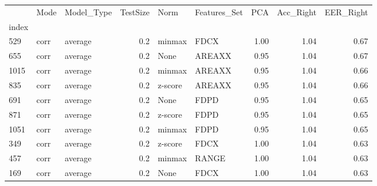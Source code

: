 \begin{tabular}{lllrllrrr}
\toprule
{} &  Mode & Model\_Type &  TestSize &     Norm & Features\_Set &   PCA &  Acc\_Right &  EER\_Right \\
index &       &            &           &          &              &       &            &            \\
\midrule
529   &  corr &    average &       0.2 &   minmax &         FDCX &  1.00 &       1.04 &       0.67 \\
655   &  corr &    average &       0.2 &     None &       AREAXX &  0.95 &       1.04 &       0.67 \\
1015  &  corr &    average &       0.2 &   minmax &       AREAXX &  0.95 &       1.04 &       0.66 \\
835   &  corr &    average &       0.2 &  z-score &       AREAXX &  0.95 &       1.04 &       0.66 \\
691   &  corr &    average &       0.2 &     None &         FDPD &  0.95 &       1.04 &       0.65 \\
871   &  corr &    average &       0.2 &  z-score &         FDPD &  0.95 &       1.04 &       0.65 \\
1051  &  corr &    average &       0.2 &   minmax &         FDPD &  0.95 &       1.04 &       0.65 \\
349   &  corr &    average &       0.2 &  z-score &         FDCX &  1.00 &       1.04 &       0.63 \\
457   &  corr &    average &       0.2 &   minmax &        RANGE &  1.00 &       1.04 &       0.63 \\
169   &  corr &    average &       0.2 &     None &         FDCX &  1.00 &       1.04 &       0.63 \\
\bottomrule
\end{tabular}
